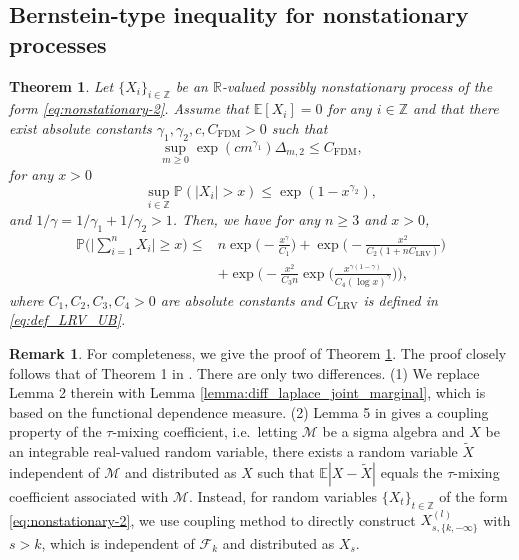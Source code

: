 \documentclass[11pt]{article}
\theoremstyle{plain}
\newtheorem{theorem}{Theorem}
\theoremstyle{definition}
\newtheorem{remark}{Remark}
\begin{document}
\subsection{Bernstein-type inequality for nonstationary processes}
\begin{theorem}\label{thm:bernstein_exp_subExp_nonlinear-2}
Let $\{X_i\}_{i \in \mathbb{Z}}$ be an $\mathbb{R}$-valued possibly nonstationary process of the form \eqref{eq:nonstationary-2}. Assume that $\mathbb{E}[X_i] = 0$ for any $i \in \mathbb{Z}$ and that there exist absolute constants $\gamma_1, \gamma_2, c, C_{\mathrm{FDM}} > 0$ such that
\begin{equation}\label{eq:dep_exponential_gamma1_2}
    \sup_{m \geq 0}\exp(cm^{\gamma_1})\Delta_{m,2} \leq C_{\mathrm{FDM}},
\end{equation}
for any $x > 0$ \begin{equation}\label{eq:moment_psi_gamma2_2}
    \sup_{i \in \mathbb{Z}}\mathbb{P}(|X_i| > x) \leq \exp(1 - x^{\gamma_2}),
\end{equation}
and $1/\gamma = 1/\gamma_1 + 1/\gamma_2 > 1$.
Then, we have for any $n \geq 3$ and $x > 0$,
\begin{align*}
    \mathbb{P}\Big( \Big|\sum_{i = 1}^nX_i\Big| \geq x \Big) \leq& n\exp\Big(-\frac{x^{\gamma}}{C_1}\Big) + \exp\Big(-\frac{x^2}{C_2(1+nC_{\mathrm{LRV}})}\Big)\\
    &+ \exp\Big(-\frac{x^2}{C_3n}\exp\Big(\frac{x^{\gamma(1-\gamma)}}{C_4(\log x)^{\gamma}}\Big)\Big),
\end{align*}
where $C_1, C_2, C_3, C_4 > 0$ are absolute constants and $C_{\mathrm{LRV}}$ is defined in \eqref{eq:def_LRV_UB}. 
\end{theorem}

\begin{remark}
For completeness, we give the proof of Theorem \ref{thm:bernstein_exp_subExp_nonlinear-2}. The proof closely follows that of Theorem 1 in \cite{merlevede2011bernstein}. There are only two differences. (1) We replace Lemma 2 therein with Lemma \ref{lemma:diff_laplace_joint_marginal}, which is based on the functional dependence measure. (2) Lemma 5 in \cite{dedecker2004coupling} gives a coupling property of the $\tau$-mixing coefficient, i.e.~letting $\mathcal{M}$ be a sigma algebra and $X$ be an integrable
real-valued random variable, there exists a random variable $\tilde{X}$ independent of $\mathcal{M}$ and distributed as $X$ such that $\mathbb{E}|X - \tilde{X}|$ equals the $\tau$-mixing coefficient associated with $\mathcal{M}$. Instead, for random variables $\{X_t\}_{t \in \mathbb{Z}}$ of the form \eqref{eq:nonstationary-2}, we use coupling method \cite[see e.g.][]{berkes2009asymptotic} to directly construct $X_{s, \{k, -\infty\}}^{(l)}$ with $s > k$, which is independent of $\mathcal{F}_{k}$ and distributed as $X_s$.
\end{remark}
\end{document}
